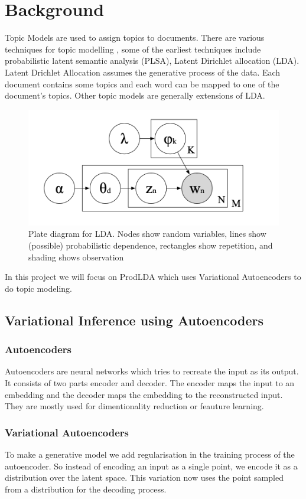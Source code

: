 \documentclass[11pt]{article}
\theoremstyle{definition}
\theoremstyle{theorem}
\begin{document}
\section{Background}

Topic Models are used to assign topics to documents. There are various techniques for topic modelling , some of the earliest techniques include  probabilistic latent semantic analysis (PLSA)\cite{plsa}, Latent Dirichlet allocation (LDA)\cite{blei2003latent}. Latent Drichlet Allocation assumes the generative process of the data. Each document contains some topics and each word can be mapped to one of the document's topics. Other topic models are generally extensions of LDA. 
\begin{figure}
  \includegraphics[width=\linewidth]{lda}
  \caption{Plate diagram for LDA. Nodes show random variables, lines show
(possible) probabilistic dependence, rectangles show repetition, and shading shows
observation}
  \label{fig:ldaplate}
\end{figure}

In this project we will focus on ProdLDA\cite{prodlda} which uses Variational Autoencoders to do topic modeling. \subsection{Variational Inference using Autoencoders}
\subsubsection{Autoencoders}
Autoencoders are neural networks which tries to recreate the input as its output. It consists of two parts encoder and decoder. The encoder maps the input to an embedding and the decoder maps the embedding to the reconstructed input. They are mostly used for dimentionality reduction or feauture learning. 
\subsubsection{Variational Autoencoders\cite{vae}}
To make a generative model we add regularisation in the training process of the autoencoder. So instead of encoding an input as a single point, we encode it as a distribution over the latent space. This variation now uses the point sampled from a distribution for the decoding process. 
\end{document}
